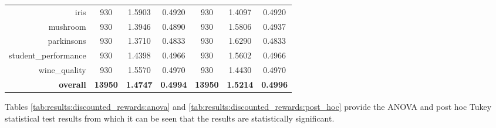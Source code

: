 \begin{table}[htbp]
{\begin{tabular}{rcccccc}
			iris                               & 930                                & 1.5903                                                                             & 0.4920          & 930                               & \cellcolor[rgb]{ .776,  .937,  .808}\textcolor[rgb]{ 0,  .38,  0}{1.4097} & 0.4920          \\
			mushroom                           & 930                                & \cellcolor[rgb]{ .776,  .937,  .808}\textcolor[rgb]{ 0,  .38,  0}{1.3946}          & 0.4890          & 930                               & 1.5806                                                                    & 0.4937          \\
			parkinsons                         & 930                                & \cellcolor[rgb]{ .776,  .937,  .808}\textcolor[rgb]{ 0,  .38,  0}{1.3710}          & 0.4833          & 930                               & 1.6290                                                                    & 0.4833          \\
			student\_performance               & 930                                & \cellcolor[rgb]{ .776,  .937,  .808}\textcolor[rgb]{ 0,  .38,  0}{1.4398}          & 0.4966          & 930                               & 1.5602                                                                    & 0.4966          \\
			wine\_quality                      & 930                                & 1.5570                                                                             & 0.4970          & 930                               & \cellcolor[rgb]{ .776,  .937,  .808}\textcolor[rgb]{ 0,  .38,  0}{1.4430} & 0.4970          \\
			\midrule
			\textbf{overall}                   & \textbf{13950}                     & \cellcolor[rgb]{ .776,  .937,  .808}\textcolor[rgb]{ 0,  .38,  0}{\textbf{1.4747}} & \textbf{0.4994} & \textbf{13950}                    & \textbf{1.5214}                                                           & \textbf{0.4996} \\
		\end{tabular}%
	}
\end{table}%

Tables \ref{tab:results:discounted_rewards:anova} and \ref{tab:results:discounted_rewards:post_hoc} provide the ANOVA and post hoc Tukey statistical test results from which it can be seen that the results are statistically significant.


